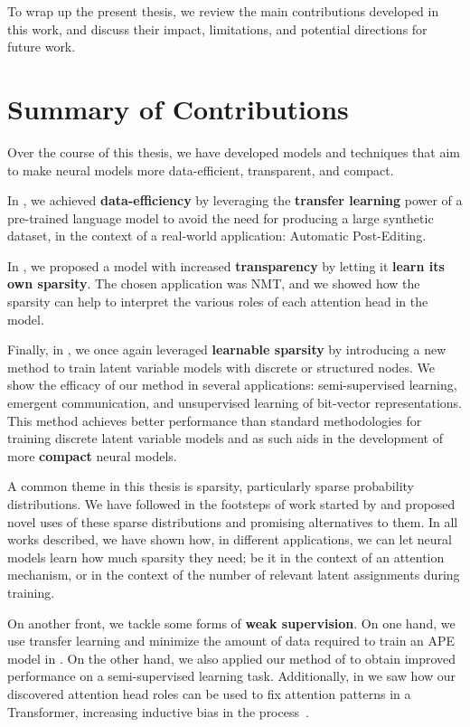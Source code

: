 \label{chap:conclusions}

\cleardoublepage
\doublespacing

To wrap up the present thesis, we review the main contributions
developed in this work, and discuss their impact, limitations, and
potential directions for future work.

\section{Summary of Contributions}

Over the course of this thesis, we have developed models and
techniques that aim to make neural models more data-efficient, transparent,
and compact.

In , we achieved \textbf{data-efficiency} by
leveraging the \textbf{transfer learning} power of a pre-trained
language model to avoid the need for producing a large synthetic
dataset, in the context of a real-world application: Automatic
Post-Editing.

In , we proposed a model with increased
\textbf{transparency} by letting it \textbf{learn its own sparsity}.
The chosen application was NMT, and we showed
how the sparsity can help to interpret the various roles of each
attention head in the model.

Finally, in , we once again leveraged
\textbf{learnable sparsity} by introducing a new method to train
latent variable models with discrete or structured nodes. We show the
efficacy of our method in several applications: semi-supervised
learning, emergent communication, and unsupervised learning of
bit-vector representations. This method achieves better performance
than standard methodologies for training discrete latent variable
models and as such aids in the development of more \textbf{compact}
neural models.

A common theme in this thesis is sparsity, particularly
sparse probability distributions. We have followed in the footsteps
of work started by \citet{sparsemax} and proposed novel uses of
these sparse distributions and promising alternatives to them.
In all works described, we have shown how, in different applications,
we can let neural models learn how much sparsity they need; be it
in the context of an attention mechanism, or in the context of
the number of relevant latent assignments during training.

On another front, we tackle some forms of \textbf{weak supervision}.
On one hand, we use transfer learning and minimize the amount of data
required to train an APE model in . On the other
hand, we also applied our method of  to
obtain improved performance on a semi-supervised learning task.
Additionally, in  we saw how our
discovered attention head roles can be used to fix attention patterns
in a Transformer, increasing inductive bias in the
process~\citep{raganato2020FixedEncoderSelfAttentiona}.

